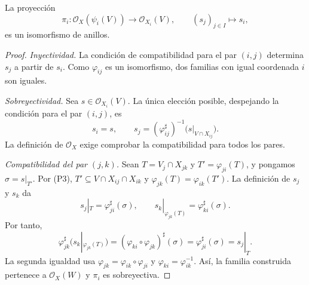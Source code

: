 \begin{lema}
\label{lema:s07-proyeccion-coordenada-iso}
La proyección
\[
\pi_i\colon \mathcal O_X(\psi_i(V))\longrightarrow\mathcal O_{X_i}(V),
\qquad (s_j)_{j\in I}\longmapsto s_i,
\]
es un isomorfismo de anillos.
\end{lema}
\begin{proof}
\emph{Inyectividad.} La condición de compatibilidad para el par $(i,j)$ determina $s_j$ a partir de $s_i$. Como $\varphi_{ij}$ es un isomorfismo, dos familias con igual coordenada $i$ son iguales.

\emph{Sobreyectividad.} Sea $s\in\mathcal O_{X_i}(V)$. La única elección posible, despejando la condición para el par $(i,j)$, es
\[
s_i=s,\qquad s_j=(\varphi_{ij}^{\sharp})^{-1}\bigl(s|_{V\cap X_{ij}}\bigr).
\]
La definición de $\mathcal O_X$ exige comprobar la compatibilidad para todos los pares.

\emph{Compatibilidad del par $(j,k)$.} Sean $T=V_j\cap X_{jk}$ y $T'=\varphi_{ji}(T)$, y pongamos $\sigma=s|_{T'}$. Por (P3), $T'\subseteq V\cap X_{ij}\cap X_{ik}$ y $\varphi_{jk}(T)=\varphi_{ik}(T')$. La definición de $s_j$ y $s_k$ da
\[
s_j|_T=\varphi_{ji}^{\sharp}(\sigma),\qquad
s_k|_{\varphi_{jk}(T)}=\varphi_{ki}^{\sharp}(\sigma).
\]
Por tanto,
\[
\varphi_{jk}^{\sharp}\bigl(s_k|_{\varphi_{jk}(T)}\bigr)
=(\varphi_{ki}\circ\varphi_{jk})^{\sharp}(\sigma)
=\varphi_{ji}^{\sharp}(\sigma)=s_j|_T.
\]
La segunda igualdad usa $\varphi_{jk}=\varphi_{ik}\circ\varphi_{ji}$ y $\varphi_{ki}=\varphi_{ik}^{-1}$. Así, la familia construida pertenece a $\mathcal O_X(W)$ y $\pi_i$ es sobreyectiva.
\end{proof}

